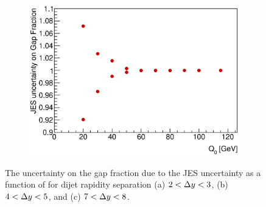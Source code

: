 \begin{figure}
        \begin{subfigure}[b]{0.5\textwidth}
                \centering
                \includegraphics[width=\textwidth]{figures/GBJ2/JES/Smeared7_8__Q0.eps}
        \end{subfigure}%
\caption[Uncertainty bands due to the JES uncertainty for gap fraction as a function of \qz{}]{
The uncertainty on the gap fraction due to the JES uncertainty as a function of \qz{} for dijet rapidity separation (a) $2<\mbox{$\Delta y$}{}<3$, (b) $4<\mbox{$\Delta y$}{}<5$, and (c) $7<\mbox{$\Delta y$}{}<8$.
\label{GBJ2:JES:Q0}}
\end{figure}

